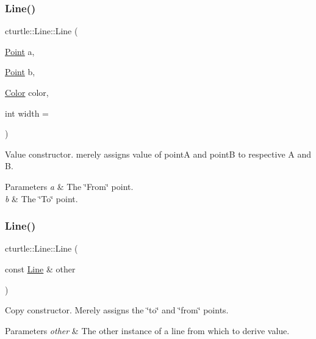 \subsubsection{\texorpdfstring{Line()}{Line()}\hspace{0.1cm}{\footnotesize\ttfamily [1/2]}}
{\footnotesize\ttfamily cturtle\+::\+Line\+::\+Line (\begin{DoxyParamCaption}\item[{\hyperlink{structcturtle_1_1ivec2}{Point}}]{a,  }\item[{\hyperlink{structcturtle_1_1ivec2}{Point}}]{b,  }\item[{\hyperlink{classcturtle_1_1Color}{Color}}]{color,  }\item[{int}]{width = {} }\end{DoxyParamCaption})\hspace{0.3cm}{\ttfamily [inline]}}



Value constructor. merely assigns value of pointA and pointB to respective A and B. 


\begin{DoxyParams}{Parameters}
{\em a} & The \char`\"{}\+From\char`\"{} point. \\
\hline
{\em b} & The \char`\"{}\+To\char`\"{} point. \\
\hline
\end{DoxyParams}
\mbox{\label{classcturtle_1_1Line_ac1b144ecd3e23c5f296b4f845f332c73}} 
\subsubsection{\texorpdfstring{Line()}{Line()}\hspace{0.1cm}{\footnotesize\ttfamily [2/2]}}
{\footnotesize\ttfamily cturtle\+::\+Line\+::\+Line (\begin{DoxyParamCaption}\item[{const \hyperlink{classcturtle_1_1Line}{Line} \&}]{other }\end{DoxyParamCaption})\hspace{0.3cm}{\ttfamily [inline]}}



Copy constructor. Merely assigns the \char`\"{}to\char`\"{} and \char`\"{}from\char`\"{} points. 


\begin{DoxyParams}{Parameters}
{\em other} & The other instance of a line from which to derive value. \\
\hline
\end{DoxyParams}


